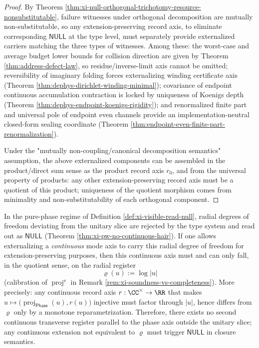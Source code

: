 \begin{proof}
By Theorem \ref{thm:xi-null-orthogonal-trichotomy-resource-nonsubstitutable}, failure witnesses under orthogonal decomposition are mutually non-substitutable, so any extension-preserving record axis, to eliminate corresponding \(\mathsf{NULL}\) at the type level, must separately provide externalized carriers matching the three types of witnesses.
Among these: the worst-case and average budget lower bounds for collision direction are given by Theorem \ref{thm:address-defect-law}, so residue/inverse-limit axis cannot be omitted; reversibility of imaginary folding forces externalizing winding certificate axis (Theorem \ref{thm:dephys-dirichlet-winding-minimal}); covariance of endpoint continuous accumulation contraction is locked by uniqueness of Koenigs depth (Theorem \ref{thm:dephys-endpoint-koenigs-rigidity}); and renormalized finite part and universal pole of endpoint even channels provide an implementation-neutral closed-form sealing coordinate (Theorem \ref{thm:endpoint-even-finite-part-renormalization}).
\par
Under the "mutually non-coupling/canonical decomposition semantics" assumption, the above externalized components can be assembled in the product/direct sum sense as the product record axis \(r_0\), and from the universal property of products: any other extension-preserving record axis must be a quotient of this product; uniqueness of the quotient morphism comes from minimality and non-substitutability of each orthogonal component.
\end{proof}

\begin{corollary}\label{cor:xi-unique-continuous-transverse-register}
In the pure-phase regime of Definition \ref{def:xi-visible-read-null}, radial degrees of freedom deviating from the unitary slice are rejected by the type system and read out as \(\mathsf{NULL}\) (Theorem \ref{thm:xi-pw-no-continuous-hair}).
If one allows externalizing a \emph{continuous} mode axis to carry this radial degree of freedom for extension-preserving purposes, then this continuous axis must and can only fall, in the quotient sense, on the radial register
\[
\varrho(u):=\log|u|
\]
(calibration of \(\operatorname{proj}^{\mathrm e}\) in Remark \ref{rem:xi-soundness-vs-completeness}).
More precisely: any continuous record axis \(r:\CC^\times\to\RR\) that makes
\(
u\mapsto \bigl(\operatorname{proj}_{\mathsf{Phase}}(u),r(u)\bigr)
\)
injective must factor through \(|u|\), hence differs from \(\varrho\) only by a monotone reparametrization.
Therefore, there exists no second continuous transverse register parallel to the phase axis outside the unitary slice; any continuous extension not equivalent to \(\varrho\) must trigger \(\mathsf{NULL}\) in closure semantics.
\end{corollary}

